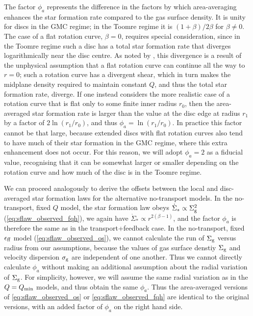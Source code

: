 \documentclass[useAMS,usenatbib]{mn2e}
\newcommand{\Qmin}{Q_{\rm min}}
\begin{document}
The factor $\phi_a$ represents the difference in the factors by which area-averaging enhances the star formation rate compared to the gas surface density. It is unity for discs in the GMC regime; in the Toomre regime it is $(1+\beta)/2\beta$ for $\beta \neq 0$. The case of a flat rotation curve, $\beta = 0$, requires special consideration, since in the Toomre regime such a disc has a total star formation rate that diverges logarithmically near the disc centre. As noted by \citet{krumholz16a}, this divergence is a result of the unphysical assumption that a flat rotation curve can continue all the way to $r=0$; such a rotation curve has a divergent shear, which in turn makes the midplane density required to maintain constant $Q$, and thus the total star formation rate, diverge. If one instead considers the more realistic case of a rotation curve that is flat only to some finite inner radius $r_0$, then the area-averaged star formation rate is larger than the value at the disc edge at radius $r_1$ by a factor of $2\ln (r_1/r_0)$, and thus $\phi_a = \ln (r_1/r_0)$. In practice this factor cannot be that large, because extended discs with flat rotation curves also tend to have much of their star formation in the GMC regime, where this extra enhancement does not occur. For this reason, we will adopt $\phi_a = 2$ as a fiducial value, recognising that it can be somewhat larger or smaller depending on the rotation curve and how much of the disc is in the Toomre regime.

We can proceed analogously to derive the offsets between the local and disc-averaged star formation laws for the alternative no-transport models. In the no-transport, fixed $Q$ model, the star formation law obeys $\dot{\Sigma}_* \propto \Sigma_{\rm g}^2$ (\autoref{eq:sflaw_observed_fqh}), we again have $\dot{\Sigma}_* \propto r^{2(\beta-1)}$, and the factor $\phi_a$ is therefore the same as in the transport+feedback case. In the no-transport, fixed $\epsilon_{\rm ff}$ model (\autoref{eq:sflaw_observed_os}), we cannot calculate the run of $\Sigma_{\rm g}$ versus radius from our assumptions, because the values of gas surface denstiy $\Sigma_{\rm g}$ and velocity dispersion $\sigma_{\rm g}$ are independent of one another. Thus we cannot directly calculate $\phi_a$ without making an additional assumption about the radial variation of $\Sigma_{\rm g}$. For simplicity, however, we will assume the same radial variation as in the $Q=\Qmin$ models, and thus obtain the same $\phi_a$. Thus the area-averaged versions of \autoref{eq:sflaw_observed_os} or \autoref{eq:sflaw_observed_fqh} are identical to the original versions, with an added factor of $\phi_a$ on the right hand side.
\end{document}
